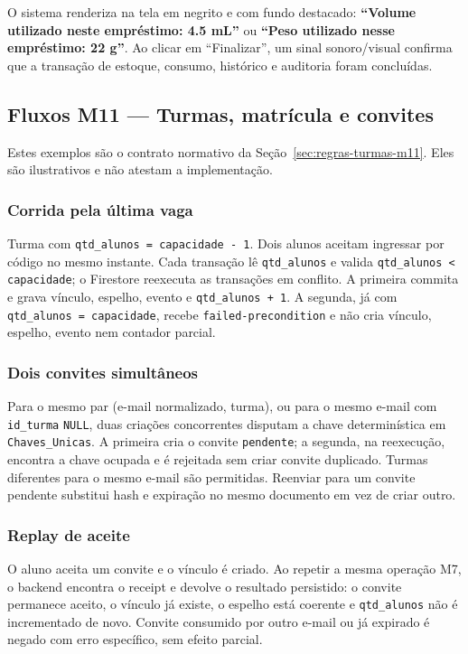 O sistema renderiza na tela em negrito e com fundo destacado: \textbf{``Volume utilizado neste empréstimo: 4.5 mL''} ou \textbf{``Peso utilizado nesse empréstimo: 22 g''}. Ao clicar em ``Finalizar'', um sinal sonoro/visual confirma que a transação de estoque, consumo, histórico e auditoria foram concluídas.


\subsection{Fluxos M11 --- Turmas, matrícula e convites}
Estes exemplos são o contrato normativo da Seção~\ref{sec:regras-turmas-m11}.
Eles são ilustrativos e não atestam a implementação.

\subsubsection{Corrida pela última vaga}
Turma com \texttt{qtd\_alunos = capacidade - 1}. Dois alunos aceitam ingressar por
código no mesmo instante. Cada transação lê \texttt{qtd\_alunos} e valida
\texttt{qtd\_alunos < capacidade}; o Firestore reexecuta as transações em
conflito. A primeira commita e grava vínculo, espelho, evento e
\texttt{qtd\_alunos + 1}. A segunda, já com \texttt{qtd\_alunos = capacidade},
recebe \texttt{failed-precondition} e não cria vínculo, espelho, evento nem
contador parcial.

\subsubsection{Dois convites simultâneos}
Para o mesmo par (e-mail normalizado, turma), ou para o mesmo e-mail com
\texttt{id\_turma} \texttt{NULL}, duas criações concorrentes disputam a chave
determinística em \texttt{Chaves\_Unicas}. A primeira cria o convite
\texttt{pendente}; a segunda, na reexecução, encontra a chave ocupada e é
rejeitada sem criar convite duplicado. Turmas diferentes para o mesmo e-mail
são permitidas. Reenviar para um convite pendente substitui hash e expiração no
mesmo documento em vez de criar outro.

\subsubsection{Replay de aceite}
O aluno aceita um convite e o vínculo é criado. Ao repetir a mesma operação
M7, o backend encontra o receipt e devolve o resultado persistido: o convite
permanece aceito, o vínculo já existe, o espelho está coerente e
\texttt{qtd\_alunos} não é incrementado de novo. Convite consumido por outro
e-mail ou já expirado é negado com erro específico, sem efeito parcial.

